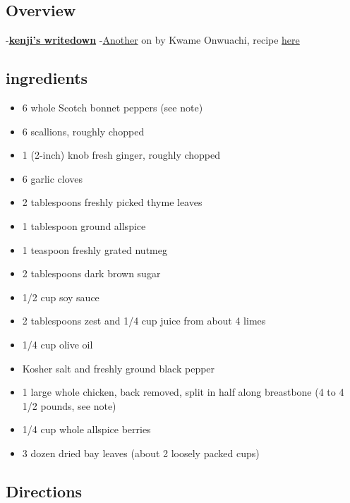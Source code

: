 \documentclass[
]{article}
\providecommand{\tightlist}{%
  \setlength{\itemsep}{0pt}\setlength{\parskip}{0pt}}
\begin{document}
\hypertarget{overview}{%
\subsection{Overview}\label{overview}}

-\href{https://www.seriouseats.com/2013/08/the-food-lab-how-to-make-jerk-chicken-at-home.html}{\textbf{kenji's writedown}}
-\href{https://www.youtube.com/watch?v=Rt460jKi4Bk}{Another} on by Kwame Onwuachi, recipe \href{https://www.vice.com/en_us/article/akw3bb/the-best-jerk-chicken-recipe}{here}

\hypertarget{ingredients-1}{%
\subsection{ingredients}\label{ingredients-1}}

\begin{itemize}
\tightlist
\item
  6 whole Scotch bonnet peppers (see note)
\item
  6 scallions, roughly chopped
\item
  1 (2-inch) knob fresh ginger, roughly chopped
\item
  6 garlic cloves
\item
  2 tablespoons freshly picked thyme leaves
\item
  1 tablespoon ground allspice
\item
  1 teaspoon freshly grated nutmeg
\item
  2 tablespoons dark brown sugar
\item
  1/2 cup soy sauce
\item
  2 tablespoons zest and 1/4 cup juice from about 4 limes
\item
  1/4 cup olive oil
\item
  Kosher salt and freshly ground black pepper
\item
  1 large whole chicken, back removed, split in half along breastbone (4 to 4 1/2 pounds, see note)
\item
  1/4 cup whole allspice berries
\item
  3 dozen dried bay leaves (about 2 loosely packed cups)
\end{itemize}

\hypertarget{directions}{%
\subsection{Directions}\label{directions}}
\end{document}
